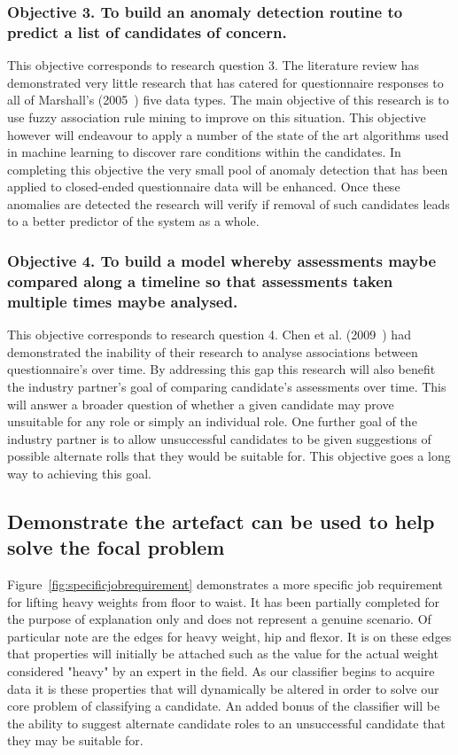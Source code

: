\subsubsection{Objective 3. To build an anomaly detection routine to predict a list of candidates of concern.}

This objective corresponds to research question 3. The literature review has demonstrated very little research that has catered for questionnaire responses to all of Marshall's (2005~\cite{marshall2005purpose}) five data types. The main objective of this research is to use fuzzy association rule mining to improve on this situation. This objective however will endeavour to apply a number of the state of the art algorithms used in machine learning to discover rare conditions within the candidates. In completing this objective the very small pool of anomaly detection that has been applied to closed-ended questionnaire data will be enhanced. Once these anomalies are detected the research will verify if removal of such candidates leads to a better predictor of the system as a whole.

\subsubsection{Objective 4. To build a model whereby assessments maybe compared along a timeline so that assessments taken multiple times maybe analysed.}

This objective corresponds to research question 4. Chen et al. (2009~\cite{chen2009mining}) had demonstrated the inability of their research to analyse associations between questionnaire's over time. By addressing this gap this research will also benefit the industry partner's goal of comparing candidate's assessments over time. This will answer a broader question of whether a given candidate may prove unsuitable for any role or simply an individual role. One further goal of the industry partner is to allow unsuccessful candidates to be given suggestions of possible alternate rolls that they would be suitable for. This objective goes a long way to achieving this goal.


\subsection{Demonstrate the artefact can be used to help solve the focal problem}

Figure~\ref{fig:specificjobrequirement} demonstrates a more specific job requirement for lifting heavy weights from floor
to waist. It has been partially completed for the purpose of explanation only and does not represent a genuine scenario.
Of particular note are the edges for heavy weight,
hip and flexor. It is on these edges that properties will initially be attached such as the value for the actual weight
considered "heavy" by an expert in the field. As our classifier begins to acquire data it is these properties that will
dynamically be altered in order to solve our core problem of classifying a candidate. An added bonus of the classifier
will be the ability to suggest alternate candidate roles to an unsuccessful candidate that they may be suitable for.

